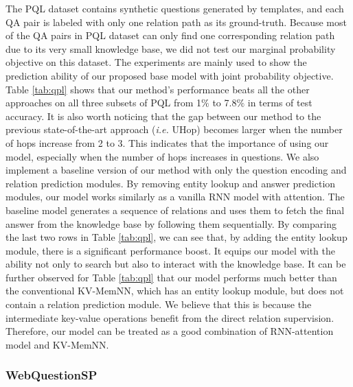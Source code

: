 The PQL dataset contains synthetic questions generated by templates, and each QA pair is labeled with only one relation path as its ground-truth. Because most of the QA pairs in PQL dataset can only find one corresponding relation path due to its very small knowledge base, we did not test our marginal probability objective on this dataset. The experiments are mainly used to show the prediction ability of our proposed base model with joint probability objective. Table \ref{tab:qpl} shows that our method's performance beats all the other approaches on all three subsets of PQL from 1$\%$ to 7.8$\%$ in terms of test accuracy. It is also worth noticing that the gap between our method to the previous state-of-the-art approach (\emph{i.e.} UHop) becomes larger when the number of hops increase from 2 to 3. This indicates that the importance of using our model, especially when the number of hops increases in questions. We also implement a baseline version of our method with only the question encoding and relation prediction modules. By removing entity lookup and answer prediction modules, our model works similarly as a vanilla RNN model with attention. The baseline model generates a sequence of relations and uses them to fetch the final answer from the knowledge base by following them sequentially. By comparing the last two rows in Table \ref{tab:qpl}, we can see that, by adding the entity lookup module, there is a significant performance boost. It equips our model with the ability not only to search but also to interact with the knowledge base. It can be further observed for Table \ref{tab:qpl} that our model performs much better than the conventional KV-MemNN, which has an entity lookup module, but does not contain a relation prediction module. We believe that this is because the intermediate key-value operations benefit from the direct relation supervision. Therefore, our model can be treated as a good combination of RNN-attention model and KV-MemNN. 
\subsubsection{WebQuestionSP}

